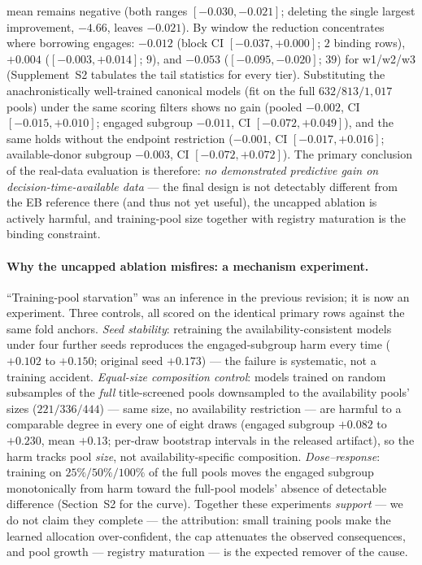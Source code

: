 \documentclass[11pt]{article}
\begin{document}
mean remains negative (both ranges $[-0.030,-0.021]$; deleting the
single largest improvement, $-4.66$, leaves $-0.021$). By window the
reduction concentrates where borrowing engages: $-0.012$ (block CI
$[-0.037,+0.000]$; $2$ binding rows), $+0.004$ ($[-0.003,+0.014]$; $9$),
and $-0.053$ ($[-0.095,-0.020]$; $39$) for w1/w2/w3
(Supplement~S2 tabulates the tail statistics for every tier). Substituting the anachronistically well-trained
canonical models (fit on the full $632/813/1{,}017$ pools) under the same
scoring filters shows no gain (pooled $-0.002$, CI $[-0.015, +0.010]$;
engaged subgroup $-0.011$, CI $[-0.072, +0.049]$), and the same holds
without the endpoint restriction ($-0.001$, CI $[-0.017, +0.016]$;
available-donor subgroup $-0.003$, CI $[-0.072, +0.072]$). The primary
conclusion of the real-data evaluation is therefore: \emph{no demonstrated
predictive gain on decision-time-available data} --- the final design is
not detectably different from the EB reference there (and thus not yet
useful), the uncapped ablation is
actively harmful,
and training-pool size together with registry maturation is the binding
constraint.

\paragraph{Why the uncapped ablation misfires: a mechanism experiment.}
``Training-pool starvation'' was an inference in the previous revision; it
is now an experiment. Three controls, all scored on the identical primary
rows against the same fold anchors. \emph{Seed stability}: retraining the
availability-consistent models under four further seeds reproduces the
engaged-subgroup harm every time ($+0.102$ to $+0.150$; original seed
$+0.173$) --- the failure is systematic, not a training accident.
\emph{Equal-size composition control}: models trained on random subsamples
of the \emph{full} title-screened pools downsampled to the availability
pools' sizes ($221/336/444$) --- same size, no availability restriction ---
are harmful to a comparable degree in every one of eight draws (engaged
subgroup $+0.082$ to $+0.230$, mean $+0.13$; per-draw bootstrap intervals
in the released artifact), so the harm tracks pool \emph{size}, not
availability-specific composition. \emph{Dose--response}: training on
$25\%/50\%/100\%$ of the full pools moves the engaged subgroup
monotonically from harm toward the full-pool models' absence of
detectable difference (Section~S2 for the curve). Together these experiments \emph{support} ---
we do not claim they complete --- the attribution: small training
pools make the learned allocation over-confident, the cap attenuates the
observed consequences, and pool growth --- registry maturation --- is the
expected remover of the cause.
\end{document}
